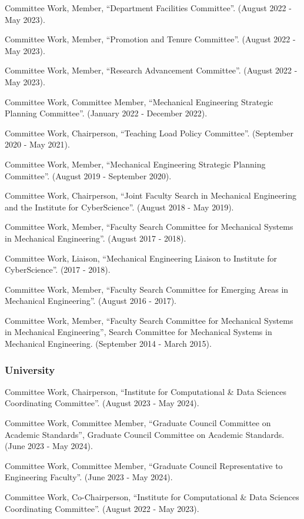\documentclass[11pt]{article}
\begin{document}
Committee Work, Member, ``Department Facilities Committee''.
(August 2022 - May 2023).

Committee Work, Member, ``Promotion and Tenure Committee''.
(August 2022 - May 2023).

Committee Work, Member, ``Research Advancement Committee''.
(August 2022 - May 2023).

Committee Work, Committee Member, ``Mechanical Engineering
Strategic Planning Committee''. 
(January 2022 - December 2022).

Committee Work, Chairperson, ``Teaching Load Policy
Committee''. 
(September 2020 - May 2021).

Committee Work, Member, ``Mechanical Engineering Strategic
Planning Committee''. 
(August 2019 - September 2020).

Committee Work, Chairperson, ``Joint Faculty Search in
Mechanical Engineering and the Institute for CyberScience''. 
(August 2018
- May 2019).

Committee Work, Member, ``Faculty Search Committee for
Mechanical Systems in Mechanical Engineering''. 
(August 2017 - 2018).

Committee Work, Liaison, ``Mechanical Engineering Liaison to
Institute for CyberScience''. 
(2017 - 2018).

Committee Work, Member, ``Faculty Search Committee for
Emerging Areas in Mechanical Engineering''. 
(August 2016 - 2017).

Committee Work, Member, ``Faculty Search Committee for
Mechanical Systems in Mechanical Engineering'', Search Committee for
Mechanical Systems in Mechanical Engineering. 
(September 2014 - March
2015).

\subsubsection{University}\label{university}

Committee Work, Chairperson, ``Institute for Computational \&
Data Sciences Coordinating Committee''. 
(August 2023 - May 2024).

Committee Work, Committee Member, ``Graduate Council
Committee on Academic Standards'', Graduate Council Committee on Academic
Standards. 
(June 2023 - May 2024).

Committee Work, Committee Member, ``Graduate Council
Representative to Engineering Faculty''. 
(June 2023 - May 2024).

Committee Work, Co-Chairperson, ``Institute for Computational
\& Data Sciences Coordinating Committee''. 
(August 2022 - May 2023).
\end{document}
